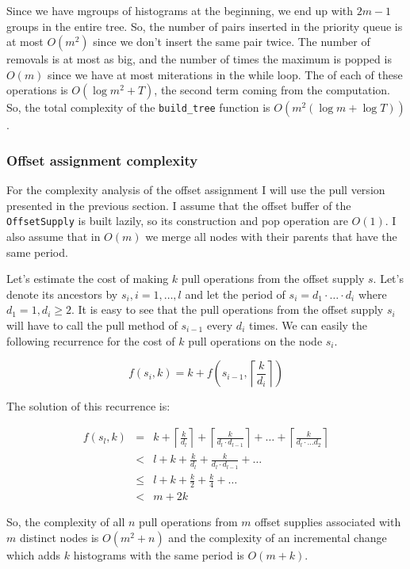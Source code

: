 

Since we have mgroups of histograms at the beginning, we end up with $2m-1$ groups in the entire tree. So, the number of pairs inserted in the priority queue is at most $O(m^2)$ since we don’t insert the same pair twice. The number of removals is at most as big, and the number of times the maximum is popped is $O(m)$ since we have at most miterations in the while loop. The of each of these operations is $O(\log m^2+T)$, the second term coming from the  computation. So, the total complexity of the \verb+build_tree+ function is $O(m^2(\log m + \log T))$. 

\subsubsection*{Offset assignment complexity}
For the complexity analysis of the offset assignment I will use the pull version presented in the previous section. I assume that the offset buffer of the \verb+OffsetSupply+ is built lazily, so its construction and pop operation are $O(1)$. I also assume that in $O(m)$ we merge all nodes with their parents that have the same period.

Let’s estimate the cost of making $k$ pull operations from the offset supply $s$. Let’s denote its ancestors by $s_i,i=1,\ldots,l$ and let the period of $s_i=d_1\cdot\ldots\cdot d_i$ where $d_1=1, d_i \geq 2$. It is easy to see that the pull operations from the offset supply $s_i$ will have to call the pull method of $s_{i-1}$ every $d_i$ times. We can easily the following recurrence for the cost of $k$ pull operations on the node $s_i$.

$$ f(s_i, k) = k + f\left(s_{i-1}, \left\lceil \frac k {d_i} \right\rceil \right)$$

The solution of this recurrence is:

\begin{eqnarray*}
f(s_l,k) &=& k+ \left\lceil \frac k {d_l} \right\rceil + \left\lceil \frac k {d_l\cdot d_{l-1}} \right\rceil + \ldots + \left\lceil \frac k {d_l\cdot \ldots d_2}\right\rceil \\
         &<&l+k+\frac k {d_l}+ \frac k {d_l\cdot d_{l-1}} + \ldots \\
         &\leq & l+k+\frac k 2+\frac k 4 + \ldots \\
         &<& m+2k
\end{eqnarray*}

So, the complexity of all $n$ pull operations from $m$ offset supplies associated with $m$ distinct nodes is $O(m^2+n)$ and the complexity of an incremental change which adds $k$ histograms with the same period is $O(m+k)$. 

